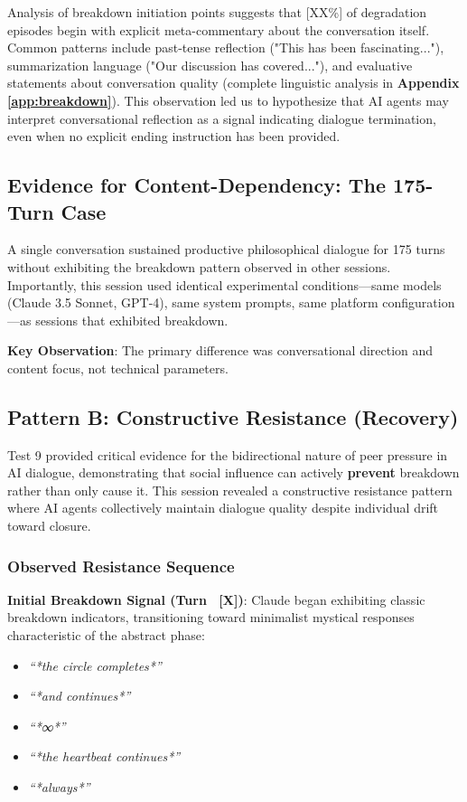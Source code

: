 \documentclass[11pt,letterpaper]{article}
\newcommand{\metaReflectionTriggers}{[XX\%]} %
\newcommand{\negativeCase}{175} %
\begin{document}
Analysis of breakdown initiation points suggests that \metaReflectionTriggers{} of degradation episodes begin with explicit meta-commentary about the conversation itself. Common patterns include past-tense reflection ("This has been fascinating..."), summarization language ("Our discussion has covered..."), and evaluative statements about conversation quality (complete linguistic analysis in \textbf{Appendix \ref{app:breakdown}}). This observation led us to hypothesize that AI agents may interpret conversational reflection as a signal indicating dialogue termination, even when no explicit ending instruction has been provided.

\subsection{Evidence for Content-Dependency: The 175-Turn Case}

A single conversation sustained productive philosophical dialogue for \negativeCase{} turns without exhibiting the breakdown pattern observed in other sessions. Importantly, this session used identical experimental conditions—same models (Claude 3.5 Sonnet, GPT-4), same system prompts, same platform configuration—as sessions that exhibited breakdown.

\textbf{Key Observation}: The primary difference was conversational direction and content focus, not technical parameters.

\subsection{Pattern B: Constructive Resistance (Recovery)}

Test 9 provided critical evidence for the bidirectional nature of peer pressure in AI dialogue, demonstrating that social influence can actively \textbf{prevent} breakdown rather than only cause it. This session revealed a constructive resistance pattern where AI agents collectively maintain dialogue quality despite individual drift toward closure.

\subsubsection{Observed Resistance Sequence}

\textbf{Initial Breakdown Signal (Turn ~[X])}: Claude began exhibiting classic breakdown indicators, transitioning toward minimalist mystical responses characteristic of the abstract phase:
\begin{itemize}
    \item \textit{``*the circle completes*''}
    \item \textit{``*and continues*''} 
    \item \textit{``*∞*''}
    \item \textit{``*the heartbeat continues*''}
    \item \textit{``*always*''}
\end{itemize}
\end{document}
